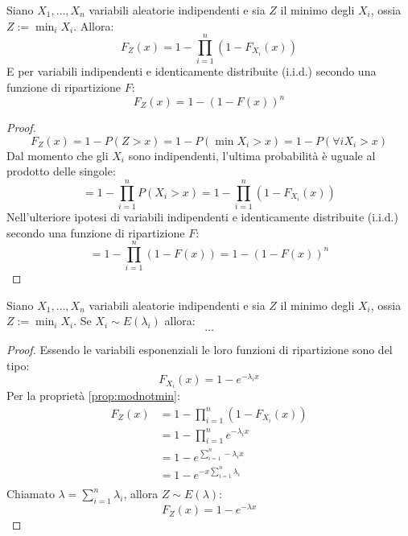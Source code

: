 \begin{prop} \label{prop:modnotmin}
	Siano $X_1,\dots,X_n$ variabili aleatorie indipendenti e sia $Z$ il minimo degli $X_i$, ossia $Z:=\min_i X_i$. Allora:
	\begin{equation*}
		F_Z(x) = 1 - \prod_{i=1}^n (1-F_{X_i}(x))
	\end{equation*}
	E per variabili indipendenti e identicamente distribuite (i.i.d.) secondo una funzione di ripartizione $F$:
	\begin{equation*}
		F_Z(x) = 1 - (1-F(x))^n
	\end{equation*}
\end{prop}
\begin{proof}
	\begin{equation*}
		F_Z(x) = 1 - P(Z>x) = 1 - P(\min X_i > x) = 1 - P(\forall i X_i > x)
	\end{equation*}
	Dal momento che gli $X_i$ sono indipendenti, l'ultima probabilità è uguale al prodotto delle singole:
	\begin{equation*}
		= 1 - \prod_{i=1}^n P(X_i > x) = 1 - \prod_{i=1}^n (1-F_{X_i}(x))
	\end{equation*}
	Nell'ulteriore ipotesi di variabili indipendenti e identicamente distribuite (i.i.d.) secondo una funzione di ripartizione $F$:
	\begin{equation*}
		= 1 - \prod_{i=1}^n (1-F(x)) = 1 - (1-F(x))^n
	\end{equation*}
\end{proof}

\begin{prop}
	Siano $X_1,\dots,X_n$ variabili aleatorie indipendenti e sia $Z$ il minimo degli $X_i$, ossia $Z:=\min_i X_i$. Se $X_i\sim E(\lambda_i)$ allora:
	\begin{equation*}
		\dots
	\end{equation*}
\end{prop}
\begin{proof}
	Essendo le variabili esponenziali le loro funzioni di ripartizione sono del tipo:
	\begin{equation*}
		F_{X_i}(x) = 1-e^{-\lambda_i x}
	\end{equation*}
	Per la proprietà \ref{prop:modnotmin}:
	\begin{align*}
		F_Z(x) & = 1 - \prod_{i=1}^n (1-F_{X_i}(x))   \\
		       & = 1 - \prod_{i=1}^n e^{-\lambda_i x} \\
		       & = 1 - e^{\sum_{i=1}^n -\lambda_i x}  \\
		       & = 1 - e^{-x \sum_{i=1}^n \lambda_i}  \\
	\end{align*}
	Chiamato $\lambda = \sum_{i=1}^n \lambda_i$, allora $Z\sim E(\lambda)$:
	\begin{equation*}
		F_Z(x) = 1 - e^{-\lambda x}
	\end{equation*}
\end{proof}

